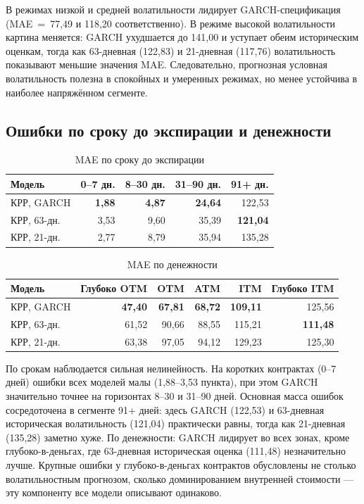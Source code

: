 \documentclass[11pt,a4paper]{article}
\begin{document}
В режимах низкой и средней волатильности лидирует GARCH-спецификация (MAE~=~77,49 и 118,20 соответственно). В режиме высокой волатильности картина меняется: GARCH ухудшается до 141,00 и уступает обеим историческим оценкам, тогда как 63-дневная (122,83) и 21-дневная (117,76) волатильность показывают меньшие значения MAE. Следовательно, прогнозная условная волатильность полезна в спокойных и умеренных режимах, но менее устойчива в наиболее напряжённом сегменте.

\subsection{Ошибки по сроку до экспирации и денежности}

\begin{table}[H]
\centering
\caption{MAE по сроку до экспирации}
\label{tab:mae-dte}
\small
\begin{tabular}{lrrrr}
\toprule
Модель & 0--7 дн. & 8--30 дн. & 31--90 дн. & 91+ дн. \\
\midrule
КРР, GARCH  & \textbf{1,88} & \textbf{4,87} & \textbf{24,64} & 122,53 \\
КРР, 63-дн. & 3,53          & 9,60          & 35,39          & \textbf{121,04} \\
КРР, 21-дн. & 2,77          & 8,79          & 35,94          & 135,28 \\
\bottomrule
\end{tabular}
\end{table}

\begin{table}[H]
\centering
\caption{MAE по денежности}
\label{tab:mae-moneyness}
\small
\begin{tabular}{lrrrrr}
\toprule
Модель & Глубоко OTM & OTM & ATM & ITM & Глубоко ITM \\
\midrule
КРР, GARCH  & \textbf{47,40}  & \textbf{67,81}  & \textbf{68,72}  & \textbf{109,11} & 125,56 \\
КРР, 63-дн. & 61,52           & 90,66           & 88,55           & 115,21          & \textbf{111,48} \\
КРР, 21-дн. & 63,38           & 97,05           & 94,12           & 129,23          & 125,30 \\
\bottomrule
\end{tabular}
\end{table}

По срокам наблюдается сильная нелинейность. На коротких контрактах (0--7 дней) ошибки всех моделей малы (1,88--3,53 пункта), при этом GARCH значительно точнее на горизонтах 8--30 и 31--90 дней. Основная масса ошибок сосредоточена в сегменте 91+ дней: здесь GARCH (122,53) и 63-дневная историческая волатильность (121,04) практически равны, тогда как 21-дневная (135,28) заметно хуже. По денежности: GARCH лидирует во всех зонах, кроме глубоко-в-деньгах, где 63-дневная историческая оценка (111,48) незначительно лучше. Крупные ошибки у глубоко-в-деньгах контрактов обусловлены не столько волатильностным прогнозом, сколько доминированием внутренней стоимости --- эту компоненту все модели описывают одинаково.
\end{document}
